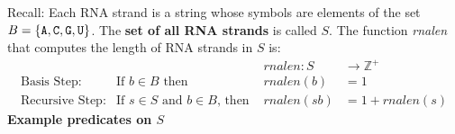 \documentclass[12pt, oneside]{article}
\begin{document}
\vfill

Recall: Each RNA strand is a string whose symbols are elements of the set $B  = \{\texttt{A}, \texttt{C}, \texttt{G}, \texttt{U} \}$.
The {\bf set of all RNA strands} is called $S$.
The function \textit{rnalen} that computes the length of RNA strands in $S$ is:
\[
\begin{array}{llll}
& & \textit{rnalen} : S & \to \mathbb{Z}^+ \\
\textrm{Basis Step:} & \textrm{If } b \in B\textrm{ then } & \textit{rnalen}(b) & = 1 \\
\textrm{Recursive Step:} & \textrm{If } s \in S\textrm{ and }b \in B\textrm{, then  } & \textit{rnalen}(sb) & = 1 + \textit{rnalen}(s)
\end{array}
\]
{\bf Example predicates on $S$}

\vspace{-20pt}
\end{document}
